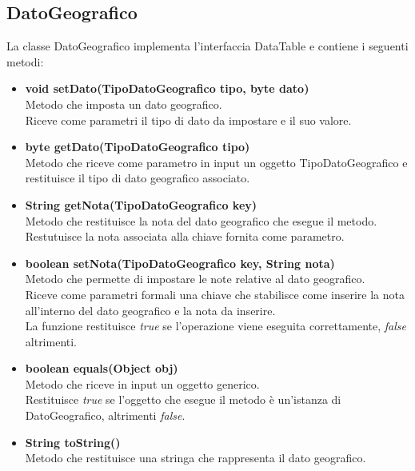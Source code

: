\documentclass[a4paper, 12pt]{scrreprt}
\begin{document}
			\subsection{DatoGeografico}
			La classe DatoGeografico implementa l'interfaccia DataTable e contiene i seguenti metodi:
			\begin{itemize}
				\item \textbf{void setDato(TipoDatoGeografico tipo, byte dato)}
				\\Metodo che imposta un dato geografico.
				\\Riceve come parametri il tipo di dato da impostare e il suo valore.
				
				\item \textbf{byte getDato(TipoDatoGeografico tipo)}
				\\Metodo che riceve come parametro in input un oggetto TipoDatoGeografico e restituisce il tipo di dato geografico associato.
				
				\item \textbf{String getNota(TipoDatoGeografico key)}
				\\Metodo che restituisce la nota del dato geografico che esegue il metodo.
				\\Restutuisce la nota associata alla chiave fornita come parametro.
				
				\item \textbf{boolean setNota(TipoDatoGeografico key, String nota)}
				\\Metodo che permette di impostare le note relative al dato geografico.
				\\Riceve come parametri formali una chiave che stabilisce come inserire la nota all'interno del dato geografico e la nota da inserire.
				\\La funzione restituisce \textit{true} se l'operazione viene eseguita correttamente, \textit{false} altrimenti.
				
				\item \textbf{boolean equals(Object obj)}
				\\Metodo che riceve in input un oggetto generico.
				\\Restituisce \textit{true} se l'oggetto che esegue il metodo \`e un'istanza di DatoGeografico, altrimenti \textit{false}.
				
				\item \textbf{String toString()}
				\\Metodo che restituisce una stringa che rappresenta il dato geografico.
				

\end{itemize}
\end{document}
